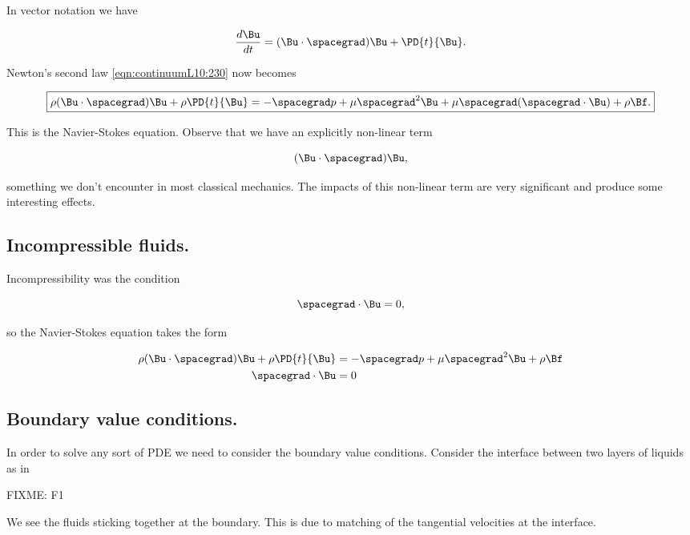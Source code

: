 In vector notation we have

\begin{equation}\label{eqn:continuumL10:290}
\frac{d\Bu}{dt} = (\Bu \cdot \spacegrad) \Bu + \PD{t}{\Bu}.
\end{equation}

Newton's second law \ref{eqn:continuumL10:230} now becomes

\begin{equation}\label{eqn:continuumL10:230b}
\boxed{
\rho 
 (\Bu \cdot \spacegrad) \Bu + \rho \PD{t}{\Bu} 
= -\spacegrad p + \mu \spacegrad^2 \Bu 
+ \mu \spacegrad (\spacegrad \cdot \Bu) + \rho \Bf.
}
\end{equation}

This is the Navier-Stokes equation.  Observe that we have an explicitly non-linear term

\begin{equation}\label{eqn:continuumL10:310}
(\Bu \cdot \spacegrad) \Bu ,
\end{equation}

something we don't encounter in most classical mechanics.  The impacts of this non-linear term are very significant and produce some interesting effects.

\subsection{Incompressible fluids.}

Incompressibility was the condition

\begin{equation}\label{eqn:continuumL10:330}
\spacegrad \cdot \Bu = 0,
\end{equation}

so the Navier-Stokes equation takes the form

\begin{equation}\label{eqn:continuumL10:230b}
\begin{aligned}
\rho 
 (\Bu \cdot \spacegrad) \Bu + \rho \PD{t}{\Bu} 
&= -\spacegrad p + \mu \spacegrad^2 \Bu 
+ \rho \Bf \\
\spacegrad \cdot \Bu &= 0
\end{aligned}
\end{equation}

\subsection{Boundary value conditions.}

In order to solve any sort of PDE we need to consider the boundary value conditions.  Consider the interface between two layers of liquids as in 

FIXME: F1

We see the fluids sticking together at the boundary.  This is due to matching of the tangential velocities at the interface.


\EndArticle
